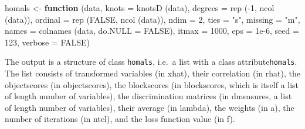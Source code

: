 \documentclass[
  12pt,
  letterpaper,
  DIV=11,
  numbers=noendperiod]{scrreprt}
\newenvironment{Shaded}{\begin{snugshade}}{\end{snugshade}}
\newcommand{\AttributeTok}[1]{\textcolor[rgb]{0.40,0.45,0.13}{#1}}
\newcommand{\ConstantTok}[1]{\textcolor[rgb]{0.56,0.35,0.01}{#1}}
\newcommand{\ControlFlowTok}[1]{\textcolor[rgb]{0.00,0.23,0.31}{\textbf{#1}}}
\newcommand{\DecValTok}[1]{\textcolor[rgb]{0.68,0.00,0.00}{#1}}
\newcommand{\FloatTok}[1]{\textcolor[rgb]{0.68,0.00,0.00}{#1}}
\newcommand{\FunctionTok}[1]{\textcolor[rgb]{0.28,0.35,0.67}{#1}}
\newcommand{\NormalTok}[1]{\textcolor[rgb]{0.00,0.23,0.31}{#1}}
\newcommand{\OtherTok}[1]{\textcolor[rgb]{0.00,0.23,0.31}{#1}}
\newcommand{\SpecialCharTok}[1]{\textcolor[rgb]{0.37,0.37,0.37}{#1}}
\newcommand{\StringTok}[1]{\textcolor[rgb]{0.13,0.47,0.30}{#1}}
\begin{document}
\begin{Shaded}
\begin{Highlighting}[]
\NormalTok{homals }\OtherTok{\textless{}{-}}
  \ControlFlowTok{function}\NormalTok{ (data,}
            \AttributeTok{knots =} \FunctionTok{knotsD}\NormalTok{ (data),}
            \AttributeTok{degrees =} \FunctionTok{rep}\NormalTok{ (}\SpecialCharTok{{-}}\DecValTok{1}\NormalTok{, }\FunctionTok{ncol}\NormalTok{ (data)),}
            \AttributeTok{ordinal =} \FunctionTok{rep}\NormalTok{ (}\ConstantTok{FALSE}\NormalTok{, }\FunctionTok{ncol}\NormalTok{ (data)),}
            \AttributeTok{ndim =} \DecValTok{2}\NormalTok{,}
            \AttributeTok{ties =} \StringTok{"s"}\NormalTok{,}
            \AttributeTok{missing =} \StringTok{"m"}\NormalTok{,}
            \AttributeTok{names =} \FunctionTok{colnames}\NormalTok{ (data, }\AttributeTok{do.NULL =} \ConstantTok{FALSE}\NormalTok{),}
            \AttributeTok{itmax =} \DecValTok{1000}\NormalTok{,}
            \AttributeTok{eps =} \FloatTok{1e{-}6}\NormalTok{,}
            \AttributeTok{seed =} \DecValTok{123}\NormalTok{,}
            \AttributeTok{verbose =} \ConstantTok{FALSE}\NormalTok{)}
\end{Highlighting}
\end{Shaded}

The output is a structure of class \texttt{homals}, i.e.~a list with a
class attribute\texttt{homals}. The list consists of transformed
variables (in xhat), their correlation (in rhat), the objectscores (in
objectscores), the blockscores (in blockscores, which is itself a list
of length number of variables), the discrimination matrices (in
dmeasures, a list of length number of variables), their average (in
lambda), the weights (in a), the number of iterations (in ntel), and the
loss function value (in f).

\begin{Shaded}
\end{Shaded}
\end{document}
